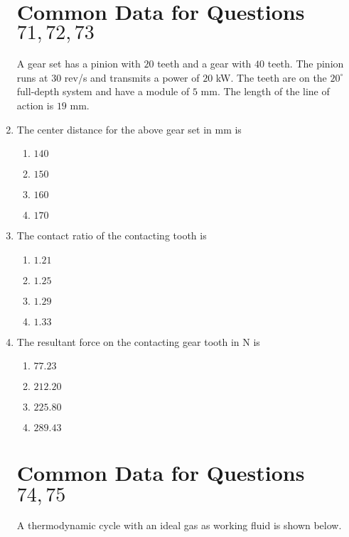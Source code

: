 \documentclass[journal,12pt,twocolumn]{IEEEtran}
\theoremstyle{remark}
\begin{document}
\begin{enumerate}[start=69]
                        \section{Common Data for Questions$ 71, 72, 73$}    
                        A gear set has a pinion with $20$ teeth and a gear with $40$ teeth. The pinion runs at $30$ rev/s and transmits a power of $20$ kW. The teeth are on the $20^\circ$ full-depth system and have a module of $5$ mm. The length of the line of action is $19$ mm.
                            \item The center distance for the above gear set in mm is
                            \begin{enumerate}
                                \item $140$
                                \item $150$
                                \item $160$
                                \item $170$
                            \end{enumerate}
                            
                            \item The contact ratio of the contacting tooth is
                            \begin{enumerate}
                                \item $1.21$
                                \item $1.25$
                                \item $1.29$
                                \item $1.33$
                            \end{enumerate}
                            
                            \item The resultant force on the contacting gear tooth in N is
                            \begin{enumerate}
                                \item $77.23$
                                \item $212.20$
                                \item $225.80$
                                \item $289.43$
                            \end{enumerate}
                        \section{Common Data for Questions $74,75$}
                        A thermodynamic cycle with an ideal gas as working fluid is shown below.
                        
                        

\end{enumerate}
\end{document}

